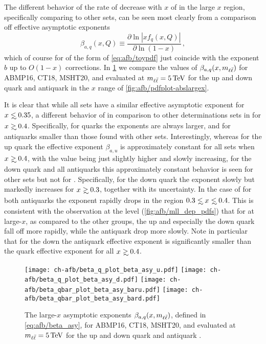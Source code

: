 The different behavior of the rate of decrease with $x$ of
\pdfs  in the large $x$ region, specifically comparing 
to other \pdf sets, can  be seen most clearly from a comparison off
effective asymptotic exponents~\cite{Ball:2016spl}
\begin{equation}
  \beta_{a,q}(x,Q)\equiv\frac{\partial \ln|xf_q(x,Q)|}{\partial \ln(1-x)}\,,
  \label{eq:afb/beta_asy}
\end{equation}
which of course for \pdfs of the form of \cref{eq:afb/toypdf} just
coincide with the exponent $b$ up to $O(1-x)$ corrections.
In \cref{fig:afb/asy_exponents} we compare
the values of $\beta_{a,q}(x,m_{\ell\bar{\ell}})$
for ABMP16, CT18, MSHT20, and  evaluated at $\mll=\SI{5}{\tera\electronvolt}$
for the up and down quark and antiquark \pdfs in the  $x$ range of
\cref{fig:afb/pdfplot-abslargex}.

It is clear that while all \pdf
sets have a similar effective asymptotic exponent for $x\lsim 0.35$, a
different behavior of  in comparison to other
determinations sets in for $x\gsim 0.4$.
%
Specifically, for quarks the  exponents are always larger,
and for antiquarks smaller than those found with other \pdf
sets.
%
Interestingly, whereas for the up quark the
effective exponent $\beta_{a,u}$ is approximately constant for all
\pdf sets when  $x\gsim 0.4$, with the  value being just
slightly higher and slowly increasing, for the down quark and all
antiquarks this approximately constant behavior is seen for other
\pdf sets but not for .
%
Specifically, for the  down quark
the exponent slowly but markedly increases for $x\gsim 0.3$, together 
with its uncertainty.
%
In the case of  for both antiquarks the exponent
rapidly drops  in the region $0.3 \lsim x \lsim 0.4$.
%
This is consistent with the observation at the \pdf level
(\cref{fig:afb/mll_dep_pdfs})  that for 
at large-$x$, as compared to the other groups,
the up and especially the down  quark fall off more rapidly, while
the antiquark \pdfs drop more slowly. Note in particular that for
the down \pdf the antiquark effective exponent is significantly
smaller than the quark effective exponent for all $x\gsim0.4$.

\begin{figure}[!t]
 \centering
 \texttt{[image: ch-afb/beta\_q\_plot\_beta\_asy\_u.pdf]}
 \texttt{[image: ch-afb/beta\_q\_plot\_beta\_asy\_d.pdf]}
 \texttt{[image: ch-afb/beta\_qbar\_plot\_beta\_asy\_baru.pdf]}
 \texttt{[image: ch-afb/beta\_qbar\_plot\_beta\_asy\_bard.pdf]}
 \caption{\small 
   The large-$x$ asymptotic exponents $\beta_{a,q}(x,m_{\ell\bar{\ell}})$, defined in
   \cref{eq:afb/beta_asy}, for ABMP16, CT18, MSHT20, and  evaluated at
   $\mll=\SI{5}{\tera\electronvolt}$ for the up and down quark and antiquark \pdfs.
 }
 \label{fig:afb/asy_exponents}
\end{figure}

